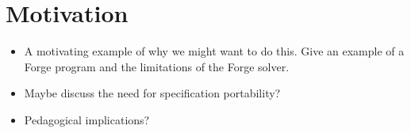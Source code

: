 \section{Motivation}

\begin{itemize}
    \item A motivating example of why we might want to do this. Give an example of a Forge program and the limitations of the Forge solver. 
    \item Maybe discuss the need for specification portability? 
    \item Pedagogical implications? 
\end{itemize}
